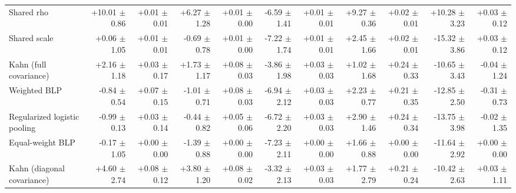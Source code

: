 \begin{tabular}{lrrrrrrrrrr}
Shared rho & +10.01 {\scriptsize $\pm$ 0.86} & +0.01 {\scriptsize $\pm$ 0.01} & +6.27 {\scriptsize $\pm$ 1.28} & +0.01 {\scriptsize $\pm$ 0.00} & -6.59 {\scriptsize $\pm$ 1.41} & +0.01 {\scriptsize $\pm$ 0.01} & +9.27 {\scriptsize $\pm$ 0.36} & +0.02 {\scriptsize $\pm$ 0.01} & +10.28 {\scriptsize $\pm$ 3.23} & +0.03 {\scriptsize $\pm$ 0.12} \\
Shared scale & +0.06 {\scriptsize $\pm$ 1.05} & +0.01 {\scriptsize $\pm$ 0.01} & -0.69 {\scriptsize $\pm$ 0.78} & +0.01 {\scriptsize $\pm$ 0.00} & -7.22 {\scriptsize $\pm$ 1.74} & +0.01 {\scriptsize $\pm$ 0.01} & +2.45 {\scriptsize $\pm$ 1.66} & +0.02 {\scriptsize $\pm$ 0.01} & -15.32 {\scriptsize $\pm$ 3.86} & +0.03 {\scriptsize $\pm$ 0.12} \\
Kahn (full covariance) & +2.16 {\scriptsize $\pm$ 1.18} & +0.03 {\scriptsize $\pm$ 0.17} & +1.73 {\scriptsize $\pm$ 1.17} & +0.08 {\scriptsize $\pm$ 0.03} & -3.86 {\scriptsize $\pm$ 1.98} & +0.03 {\scriptsize $\pm$ 0.03} & +1.02 {\scriptsize $\pm$ 1.68} & +0.24 {\scriptsize $\pm$ 0.33} & -10.65 {\scriptsize $\pm$ 3.43} & -0.04 {\scriptsize $\pm$ 1.24} \\
Weighted BLP & -0.84 {\scriptsize $\pm$ 0.54} & +0.07 {\scriptsize $\pm$ 0.15} & -1.01 {\scriptsize $\pm$ 0.71} & +0.08 {\scriptsize $\pm$ 0.03} & -6.94 {\scriptsize $\pm$ 2.12} & +0.03 {\scriptsize $\pm$ 0.03} & +2.23 {\scriptsize $\pm$ 0.77} & +0.21 {\scriptsize $\pm$ 0.35} & -12.85 {\scriptsize $\pm$ 2.50} & -0.31 {\scriptsize $\pm$ 0.73} \\
Regularized logistic pooling & -0.99 {\scriptsize $\pm$ 0.13} & +0.03 {\scriptsize $\pm$ 0.14} & -0.44 {\scriptsize $\pm$ 0.82} & +0.05 {\scriptsize $\pm$ 0.06} & -6.72 {\scriptsize $\pm$ 2.20} & +0.03 {\scriptsize $\pm$ 0.03} & +2.90 {\scriptsize $\pm$ 1.46} & +0.24 {\scriptsize $\pm$ 0.34} & -13.75 {\scriptsize $\pm$ 3.98} & -0.02 {\scriptsize $\pm$ 1.35} \\
Equal-weight BLP & -0.17 {\scriptsize $\pm$ 1.05} & +0.00 {\scriptsize $\pm$ 0.00} & -1.39 {\scriptsize $\pm$ 0.88} & +0.00 {\scriptsize $\pm$ 0.00} & -7.23 {\scriptsize $\pm$ 2.11} & +0.00 {\scriptsize $\pm$ 0.00} & +1.66 {\scriptsize $\pm$ 0.88} & +0.00 {\scriptsize $\pm$ 0.00} & -11.64 {\scriptsize $\pm$ 2.92} & +0.00 {\scriptsize $\pm$ 0.00} \\
Kahn (diagonal covariance) & +4.60 {\scriptsize $\pm$ 2.74} & +0.08 {\scriptsize $\pm$ 0.12} & +3.80 {\scriptsize $\pm$ 1.20} & +0.08 {\scriptsize $\pm$ 0.02} & -3.32 {\scriptsize $\pm$ 2.13} & +0.03 {\scriptsize $\pm$ 0.03} & +1.77 {\scriptsize $\pm$ 2.79} & +0.21 {\scriptsize $\pm$ 0.24} & -10.42 {\scriptsize $\pm$ 2.63} & +0.03 {\scriptsize $\pm$ 1.11} \\

\end{tabular}

